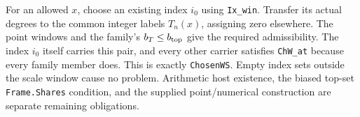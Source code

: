 For an allowed $x$, choose an existing index $i_0$ using
\texttt{Ix\_win}. Transfer its actual degrees to the common integer
labels $T_n(x)$, assigning zero elsewhere. The point windows and the
family's $b_T\le b_{\rm top}$ give the required admissibility. The
index $i_0$ itself carries this pair, and every other carrier satisfies
\texttt{ChW\_at} because every family member does. This is exactly
\texttt{ChosenWS}. Empty index sets outside the scale window cause no
problem. Arithmetic host existence, the biased top-set
\texttt{Frame.Shares} condition, and the supplied point/numerical
construction are separate remaining obligations.
